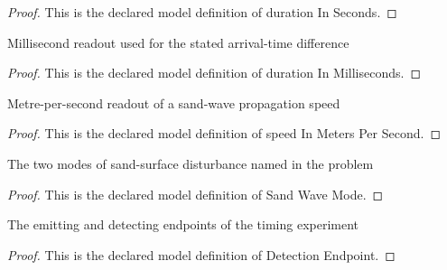 \begin{proof}
  This is the declared model definition of duration In Seconds.
\end{proof}
\begin{definition}
  \label{def:physics:phyx-mini-0286:phyxminiproblems-problemphyxmini0286-durationinmilliseconds}
  Millisecond readout used for the stated arrival-time difference
\end{definition}
\begin{proof}
  This is the declared model definition of duration In Milliseconds.
\end{proof}
\begin{definition}
  \label{def:physics:phyx-mini-0286:phyxminiproblems-problemphyxmini0286-speedinmeterspersecond}
  Metre-per-second readout of a sand-wave propagation speed
\end{definition}
\begin{proof}
  This is the declared model definition of speed In Meters Per Second.
\end{proof}
\begin{definition}
  \label{def:physics:phyx-mini-0286:phyxminiproblems-problemphyxmini0286-sandwavemode}
  The two modes of sand-surface disturbance named in the problem
\end{definition}
\begin{proof}
  This is the declared model definition of Sand Wave Mode.
\end{proof}
\begin{definition}
  \label{def:physics:phyx-mini-0286:phyxminiproblems-problemphyxmini0286-detectionendpoint}
  The emitting and detecting endpoints of the timing experiment
\end{definition}
\begin{proof}
  This is the declared model definition of Detection Endpoint.
\end{proof}
